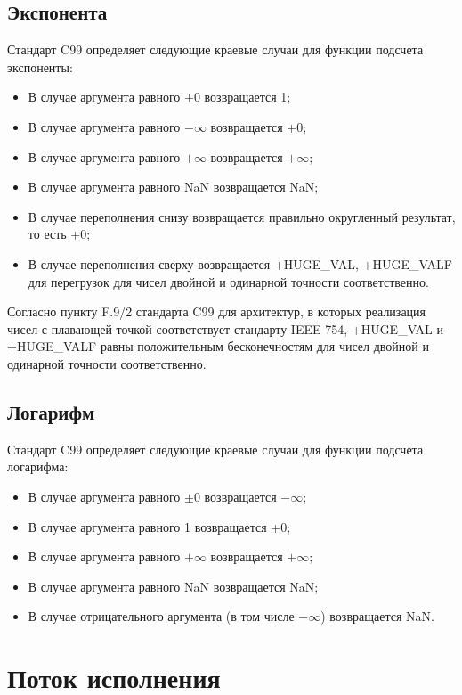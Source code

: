 \subsection{Экспонента}

Стандарт C99\cite{c99} определяет следующие краевые случаи для функции подсчета экспоненты:

\begin{itemize}
    \item В случае аргумента равного $\pm 0$ возвращается 1;
    \item В случае аргумента равного $-\infty$ возвращается +0;
    \item В случае аргумента равного $+\infty$ возвращается $+\infty$;
    \item В случае аргумента равного NaN возвращается NaN;
    \item В случае переполнения снизу возвращается правильно округленный результат, то есть +0;
    \item В случае переполнения сверху возвращается +HUGE\_VAL, +HUGE\_VALF для перегрузок для чисел двойной и одинарной точности соответственно.
\end{itemize}

Согласно пункту F.9/2 стандарта C99 для архитектур, в которых реализация чисел с плавающей точкой соответствует стандарту IEEE 754, +HUGE\_VAL и +HUGE\_VALF равны положительным бесконечностям для чисел двойной и одинарной точности соответственно.

\subsection{Логарифм}

Стандарт C99\cite{c99} определяет следующие краевые случаи для функции подсчета логарифма:

\begin{itemize}
    \item В случае аргумента равного $\pm 0$ возвращается $-\infty$;
    \item В случае аргумента равного 1 возвращается +0;
    \item В случае аргумента равного $+\infty$ возвращается $+\infty$;
    \item В случае аргумента равного NaN возвращается NaN;
    \item В случае отрицательного аргумента (в том числе $-\infty$) возвращается NaN.
\end{itemize}

\section{Поток исполнения}

